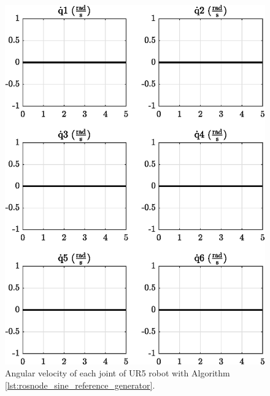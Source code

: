 \begin{figure}
    \centering
    \includegraphics{images/act_1.2/joint_velocity.eps}
    \caption{Angular velocity of each joint of UR5 robot with Algorithm \ref{lst:rosnode_sine_reference_generator}.}
    \label{fig:act_1.2_joint_velocity}
\end{figure}

